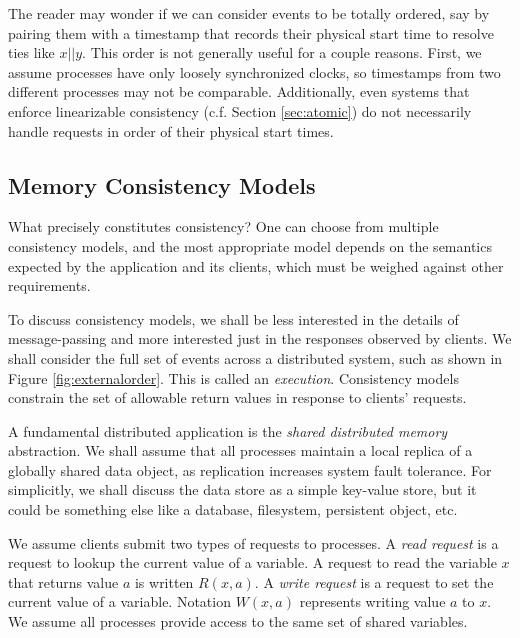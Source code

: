 \documentclass[]             %
{NASA}                       %
\theoremstyle{definition}
\begin{document}
The reader may wonder if we can consider events to be totally ordered,
say by pairing them with a timestamp that records their physical start
time to resolve ties like \(x || y\). This order is not generally useful
for a couple reasons. First, we assume processes have only loosely
synchronized clocks, so timestamps from two different processes may not
be comparable. Additionally, even systems that enforce linearizable
consistency (c.f. Section \ref{sec:atomic}) do not necessarily handle
requests in order of their physical start times.

\hypertarget{memory-consistency-models}{%
\subsection{Memory Consistency Models}\label{memory-consistency-models}}

\label{sec:atomic}

What precisely constitutes consistency? One can choose from multiple
consistency models, and the most appropriate model depends on the
semantics expected by the application and its clients, which must be
weighed against other requirements.

To discuss consistency models, we shall be less interested in the
details of message-passing and more interested just in the responses
observed by clients. We shall consider the full set of events across a
distributed system, such as shown in Figure \ref{fig:externalorder}.
This is called an \emph{execution}. Consistency models constrain the set
of allowable return values in response to clients' requests.

A fundamental distributed application is the \emph{shared distributed
memory} abstraction. We shall assume that all processes maintain a local
replica of a globally shared data object, as replication increases
system fault tolerance. For simplicitly, we shall discuss the data store
as a simple key-value store, but it could be something else like a
database, filesystem, persistent object, etc.

We assume clients submit two types of requests to processes. A
\emph{read request} is a request to lookup the current value of a
variable. A request to read the variable \(x\) that returns value \(a\)
is written \(R(x,a)\). A \emph{write request} is a request to set the
current value of a variable. Notation \(W(x,a)\) represents writing
value \(a\) to \(x\). We assume all processes provide access to the same
set of shared variables.
\end{document}

